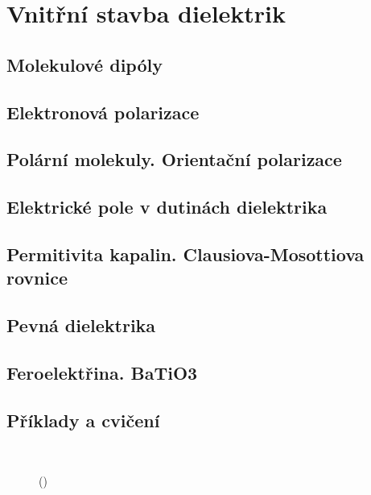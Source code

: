 \setchaptertoc
\chapter{Vnitřní stavba dielektrik}\label{fyz:IIchapXI}

  \section{Molekulové dipóly}\label{fyz:IIchapXIsecI}
  \section{Elektronová polarizace}\label{fyz:IIchapXIsecII}
  \section{Polární molekuly. Orientační polarizace}\label{fyz:IIchapXIsecIII}
  \section{Elektrické pole v dutinách dielektrika}\label{fyz:IIchapXIsecIV}
  \section{Permitivita kapalin. Clausiova-Mosottiova rovnice}\label{fyz:IIchapXIsecV}
  \section{Pevná dielektrika}\label{fyz:IIchapXIsecVI}
  \section{Feroelektřina. BaTiO3}\label{fyz:IIchapXIsecVII}
  \section{Příklady a cvičení}\label{fyz:IIchapXIsecVIII}

    \begin{figure}[ht!]
      \centering
                     \\
      \label{fyz:fig714}
      \caption{
               (\cite[s.~748]{Feynman02})}
    \end{figure}


